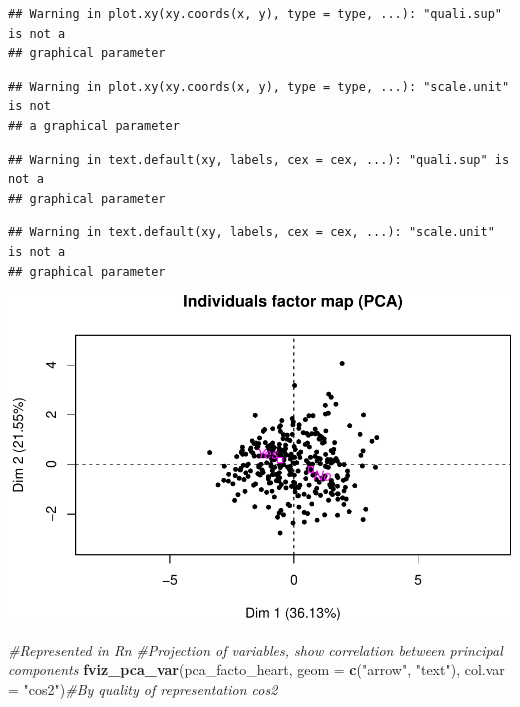 \documentclass[]{article}
\newenvironment{Shaded}{\begin{snugshade}}{\end{snugshade}}
\newcommand{\KeywordTok}[1]{\textcolor[rgb]{0.13,0.29,0.53}{\textbf{#1}}}
\newcommand{\DataTypeTok}[1]{\textcolor[rgb]{0.13,0.29,0.53}{#1}}
\newcommand{\StringTok}[1]{\textcolor[rgb]{0.31,0.60,0.02}{#1}}
\newcommand{\CommentTok}[1]{\textcolor[rgb]{0.56,0.35,0.01}{\textit{#1}}}
\newcommand{\NormalTok}[1]{#1}
\begin{document}
\begin{verbatim}
## Warning in plot.xy(xy.coords(x, y), type = type, ...): "quali.sup" is not a
## graphical parameter
\end{verbatim}

\begin{verbatim}
## Warning in plot.xy(xy.coords(x, y), type = type, ...): "scale.unit" is not
## a graphical parameter
\end{verbatim}

\begin{verbatim}
## Warning in text.default(xy, labels, cex = cex, ...): "quali.sup" is not a
## graphical parameter
\end{verbatim}

\begin{verbatim}
## Warning in text.default(xy, labels, cex = cex, ...): "scale.unit" is not a
## graphical parameter
\end{verbatim}

\includegraphics{project_report_files/figure-latex/unnamed-chunk-11-2.pdf}

\begin{Shaded}
\begin{Highlighting}[]
\CommentTok{#Represented in Rn}
\CommentTok{#Projection of variables, show correlation between principal components}
\KeywordTok{fviz_pca_var}\NormalTok{(pca_facto_heart, }\DataTypeTok{geom =} \KeywordTok{c}\NormalTok{(}\StringTok{"arrow"}\NormalTok{, }\StringTok{"text"}\NormalTok{), }\DataTypeTok{col.var =} \StringTok{"cos2"}\NormalTok{)}\CommentTok{#By quality of representation cos2}
\end{Highlighting}
\end{Shaded}
\end{document}
